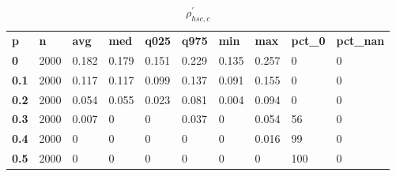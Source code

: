 \begin{table}[h]
 \centering 
\footnotesize
\caption{$\rho_{hsc,c}^\prime $}
\label{tab:alphahscc}
\begin{tabular}[h]{| l l l l l l l l l l|
    } \hline
\textbf{ p} & \textbf{ n} & \textbf{ avg} & \textbf{ med} & \textbf{ q025} & \textbf{ q975} & \textbf{ min} & \textbf{ max} & \textbf{ pct\_0} & \textbf{ pct\_nan}
           \\
  \textbf{  0} & 2000 & 0.182 & 0.179 & 0.151 & 0.229 & 0.135 & 0.257 &   0 & 0
           \\
  \textbf{0.1} & 2000 & 0.117 & 0.117 & 0.099 & 0.137 & 0.091 & 0.155 &   0 & 0
           \\
  \textbf{0.2} & 2000 & 0.054 & 0.055 & 0.023 & 0.081 & 0.004 & 0.094 &   0 & 0
           \\
  \textbf{0.3} & 2000 & 0.007 &     0 &     0 & 0.037 &     0 & 0.054 &  56 & 0
           \\
  \textbf{0.4} & 2000 &     0 &     0 &     0 &     0 &     0 & 0.016 &  99 & 0
           \\
  \textbf{0.5} & 2000 &     0 &     0 &     0 &     0 &     0 &     0 & 100 & 0
           \\
 \hline \end{tabular}
 \end{table}
